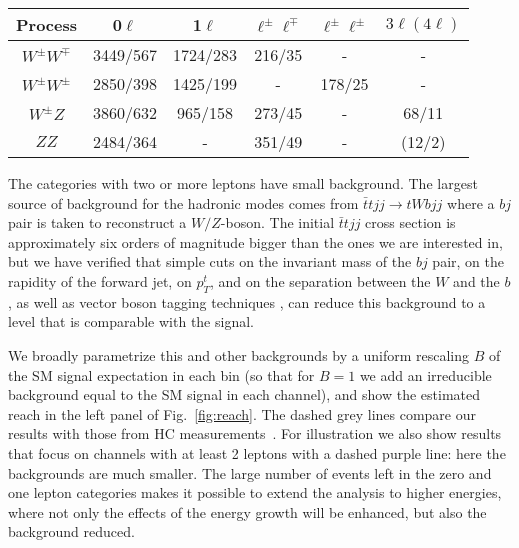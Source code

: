 \begin{center}
\begin{tabular}{|c|c|c|c|c|c|}
\hline
Process& 0$\ell$ & 1$\ell$ & $\ell^\pm\ell^\mp$ & $\ell^\pm\ell^\pm$ & $3\ell(4\ell)$\\
 \hline
 $W^\pm W^\mp$    &  3449/567 & 1724/283 & 216/35 & - & -  \\
 $W^\pm W^\pm$    &  2850/398 & 1425/199 & - & 178/25 & -  \\
 $W^\pm Z$   &  3860/632& 965/158 & 273/45 & - & 68/11 \\
 $Z Z$    &  2484/364& - & 351/49 & - &  (12/2) \\\hline
\end{tabular}
 \end{center}
 
The categories with two or more leptons have small background.
%
The largest source of background for the hadronic modes comes from $\bar t t jj\to tWbjj$ where a $bj$ pair is taken to reconstruct a $W/Z$-boson.
The initial $\bar{t}tjj$ cross section is approximately six orders of magnitude bigger than the ones we are interested in, but we have verified that simple cuts on the invariant mass of the $bj$ pair, on the rapidity of the forward jet, on $p_T^t$, and on the separation between the $W$ and the $b$, as well as vector boson tagging techniques \cite{ATLAS-CONF-2018-016}, can reduce this background to a level that is comparable with the signal.

We broadly parametrize this and other backgrounds by a uniform rescaling $B$ of the SM signal expectation in each bin (so that for $B=1$ we add an irreducible background equal to the SM signal in each channel), and show the estimated reach in the left panel of Fig.~\ref{fig:reach}. The dashed grey lines compare our results with those from HC measurements~\cite{HLHEReport}. For illustration we also show  results that focus on channels with at least 2 leptons with a dashed purple line: here the backgrounds are much smaller. The large number of events left in the zero and one lepton categories makes it possible to extend the analysis to higher energies, where not only the effects of the energy growth will be enhanced, but also the background reduced.






